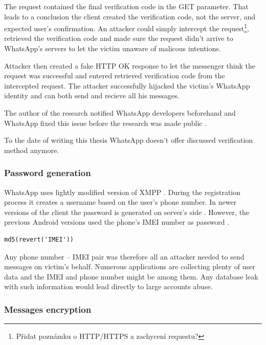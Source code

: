\documentclass[thesis=M,english]{FITthesis}[2012/10/20]
\begin{document}
The request contained the final verification code in the GET parameter. That leads to a conclusion the client created the verification code, not the server, and expected user's confirmation. An attacker could simply intercept the request\footnote{Přidat poznámku o HTTP/HTTPS a zachycení requestu?}, retrieved the verification code and made sure the request didn't arrive to WhatsApp's servers to let the victim unaware of malicous intentions.

Attacker then created a fake HTTP OK response to let the messenger think the request was successful and entered retrieved verification code from the intercepted request. The attacker successfully hijacked the victim's WhatsApp identity and can both send and recieve all his messages.

The author of the research notified WhatsApp developers beforehand and WhatsApp fixed this issue before the research was made public \cite{whatsapp-shootingthemsg}.

To the date of writing this thesis WhatsApp doesn't offer discussed verification method anymore.


\subsubsection{Password generation}

WhatsApp uses lightly modified version of XMPP \cite{whatsapp-xmpp}. During the registration process it creates a username based on the user's phone number. In newer versions of the client the password is generated on server's side \cite{whatsapp-imei}. However, the previous Android versions used the phone's IMEI  number as password \cite{whatsapp-imei}\cite{whatsapp-imei2}.

\begin{lstlisting}[caption={Pseudo-code of password generation on Android}]
md5(revert('IMEI')) 
\end{lstlisting}

Any phone number -- IMEI pair was therefore all an attacker needed to send messages on victim's behalf. Numerous applications are collecting plenty of user data and the IMEI and phone number might be among them. Any database leak with such information would lead directly to large accounts abuse.

\subsubsection{Messages encryption}
\end{document}
